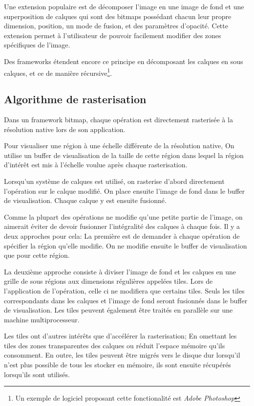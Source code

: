 			Une extension populaire est de décomposer l'image en une image de fond et une superposition de calques qui sont des bitmaps possédant chacun leur propre
			dimension, position, un mode de fusion, et des paramètres d'opacité. Cette extension permet à l'utilisateur de pouvoir facilement modifier des zones
			spécifiques de l'image.

			Des frameworks étendent encore ce principe en décomposant les calques en sous calques, et ce de manière récursive\footnote{Un exemple de logiciel proposant cette fonctionalité est \emph{Adobe Photoshop}}. 

		\subsection{Algorithme de rasterisation}
			Dans un framework bitmap, chaque opération est directement rasterisée à la résolution native lors de son application. 
			
			Pour visualiser une région à une échelle différente de la résolution native, On utilise un buffer de visualisation de la taille
			de cette région dans lequel la région d'intérêt est mis à l'échelle voulue après chaque rasterisation.
			
			Lorsqu'un système de calques est utilisé, on rasterise d'abord directement l'opération sur le calque modifié. On place ensuite l'image
			de fond dans le buffer de visualisation. Chaque calque y est ensuite fusionné.			
			
			Comme la plupart des opérations ne modifie qu'une petite partie de l'image, on aimerait éviter de devoir fusionner l'intégralité
			des calques à chaque fois. Il y a deux approches pour cela: La première est de demander à chaque opération de spécifier la région
			qu'elle modifie. On ne modifie ensuite le buffer de visualisation que pour cette région. 

			La deuxième approche consiste à diviser l'image de fond et les calques en une grille de sous régions aux dimensions régulières appelées
			tiles. Lors de l'application de l'opération, celle ci ne modifiera que certains tiles. Seuls les tiles correspondants dans les calques
			et l'image de fond seront fusionnés dans le buffer de visualisation. Les tiles peuvent également être traités en parallèle sur une 
			machine multiprocesseur.

			Les tiles ont d'autres intérêts que d'accélérer la rasterisation; En omettant les tiles des zones transparentes des calques ou réduit 
			l'espace mémoire qu'ils consomment. En outre, les tiles peuvent être migrés vers le disque dur lorsqu'il n'est plus possible de tous
			les stocker en mémoire, ils sont ensuite récupérés lorsqu'ils sont utilisés. 
			
